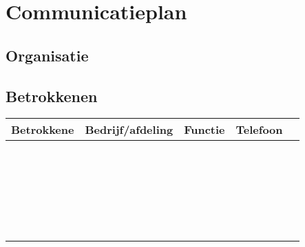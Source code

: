 \documentclass[10pt,a4paper]{report}
\begin{document}
\chapter{Communicatieplan}
\section{Organisatie}
\section{Betrokkenen}
\begin{tabular}{| l | l | l | l | l|}
\hline
\rowcolor[gray]{0.84}Betrokkene & Bedrijf/afdeling & Functie & Telefoon\\
\hline
\  & \ & \ & \ \\
\hline
\  & \ & \ & \ \\
\hline
\  & \ & \ & \ \\
\hline
\  & \ & \ & \ \\
\hline
\  & \ & \ & \ \\
\hline
\end{tabular}
\end{document}
